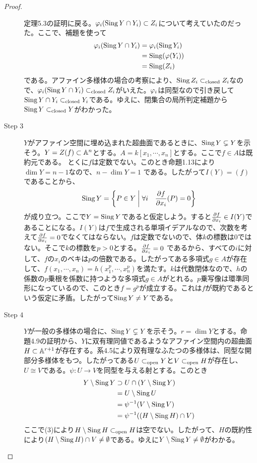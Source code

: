 \begin{proof}
\begin{description}
定理5.3の証明に戻る。${\varphi}_i (\operatorname{Sing} Y \cap Y_i) \subset Z_i$について考えていたのだった。ここで、補題を使って
\begin{align*}
  {\varphi}_i (\operatorname{Sing} Y \cap Y_i) &= {\varphi}_i ( \operatorname{Sing} Y_i) \\
  &= \operatorname{Sing} ({\varphi}(Y_i)) \\
  &= \operatorname{Sing} (Z_i)
\end{align*}
である。アファイン多様体の場合の考察により、$\operatorname{Sing} Z_i \subset_{\text{closed}} Z_i$なので、${\varphi}_i (\operatorname{Sing} Y \cap Y_i) \subset_{\text{closed}} Z_i$がいえた。${\varphi}_i$は同型なので引き戻して$\operatorname{Sing} Y \cap Y_i \subset_{\text{closed}} Y_i$である。ゆえに、閉集合の局所判定補題から$\operatorname{Sing} Y \subset_{\text{closed}} Y$がわかった。
\item[Step 3] $Y$がアファイン空間に埋め込まれた超曲面であるときに、$\operatorname{Sing} Y \subsetneq Y$を示そう。$Y = Z(f) \subset {\mathbb A}^n$とする。$A =  k[x_1, \cdots , x_n]$とする。ここで$f \in A$は既約元である。
とくに$f$は定数でない。このとき命題1.13により$\dim Y = n-1$なので、$n - \dim Y = 1$
である。したがって$I(Y) = ( f )$であることから、
\[
\operatorname{Sing} Y  = \left\{ P \in Y \mathrel{} \middle| \mathrel{} \forall i \quad  \frac{\partial f}{\partial x_i}(P) = 0  \right\}
\]
が成り立つ。ここで$Y = \operatorname{Sing} Y$であると仮定しよう。すると$\frac{\partial f}{\partial x_i} \in I(Y)$であることになる。$I(Y)$は$f$で生成される単項イデアルなので、次数を考えて$\frac{\partial f}{\partial x_i} = 0$でなくてはならない。$f$は定数でないので、体$k$の標数は$0$ではない。そこで$k$の標数を$p > 0$とする。$ \frac{\partial f}{\partial x_i} = 0$
であるから、すべての$i$に対して、$f$の$x_i$のベキは$p$の倍数である。したがってある多項式$g \in A$が存在して、$f(x_1 , \cdots , x_n) = h(x_1^p, \cdots , x_n^p)$を満たす。$k$は代数閉体なので、$h$の係数の$p$乗根を係数に持つような多項式$g \in A$がとれる。$p$乗写像は環準同形になっているので、このとき$f = g^p$が成立する。これは$f$が既約であるという仮定に矛盾。したがって$\operatorname{Sing} Y \neq Y$である。
\item[Step 4] $Y$が一般の多様体の場合に、$\operatorname{Sing} Y \subsetneq Y$を示そう。$r = \dim Y$とする。命題4.9の証明から、$Y$に双有理同値であるようなアファイン空間内の超曲面$H \subset {\mathbb A}^{r+1}$が存在する。系4.5により双有理なふたつの多様体は、同型な開部分多様体をもつ。したがってある$U \subset_{\text{open}} Y$と$V \subset_{\text{open}} H$が存在し、$U \cong V$である。$\psi \colon U \to V$を同型を与える射とする。このとき
\begin{align*}
  Y \setminus \operatorname{Sing} Y &\supset U \cap (  Y \setminus \operatorname{Sing} Y) \\
  &= U \setminus \operatorname{Sing} U \\
  &= \psi^{-1}(V \setminus \operatorname{Sing} V) \\
  &= \psi^{-1}((H \setminus \operatorname{Sing} H) \cap V)
\end{align*}
  ここで(3)により$H \setminus \operatorname{Sing} H \subset_{\text{open}} H$は空でない。したがって、$H$の既約性により$(H \setminus \operatorname{Sing} H) \cap V \neq \emptyset$である。ゆえに$Y \setminus \operatorname{Sing} Y \neq \emptyset$がわかる。
 \end{description}
\end{proof}




